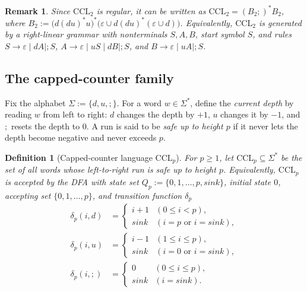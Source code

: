 \documentclass[11pt,a4paper]{article}
\newtheorem{definition}[theorem]{Definition}
\newtheorem{remark}[theorem]{Remark}
\begin{document}
\begin{remark}
Since $\mathrm{CCL}_2$ is regular, it can be written as $\mathrm{CCL}_2=(B_2;)^*B_2$, where $B_2:=\bigl(d(du)^*u\bigr)^*\bigl(\varepsilon \cup d(du)^*(\varepsilon \cup d)\bigr)$. Equivalently, $\mathrm{CCL}_2$ is generated by a \emph{right-linear grammar} with nonterminals $S,A,B$, start symbol $S$, and rules $S\to \varepsilon \mid dA \mid ;S$, $A\to \varepsilon \mid uS \mid dB \mid ;S$, and $B\to \varepsilon \mid uA \mid ;S$.
\end{remark}

\subsection{The capped-counter family}

Fix the alphabet $\Sigma:=\{d,u,;\}$. For a word $w\in\Sigma^*$, define the \emph{current depth} by reading $w$ from left to right: $d$ changes the depth by $+1$, $u$ changes it by $-1$, and $;$ resets the depth to $0$. A run is said to be \emph{safe up to height $p$} if it never lets the depth become negative and never exceeds $p$.

\begin{definition}[Capped-counter language \texorpdfstring{$\mathrm{CCL}_p$}{CCLp}]\label{def:cclp}
For $p\ge1$, let $\mathrm{CCL}_p\subseteq\Sigma^*$ be the set of all words whose left-to-right run is safe up to height $p$. Equivalently, $\mathrm{CCL}_p$ is accepted by the DFA with state set $Q_p:=\{0,1,\dots,p,\mathit{sink}\}$, initial state $0$, accepting set $\{0,1,\dots,p\}$, and transition function $\delta_p$
\[
\begin{aligned}
\delta_p(i,d)&=
\begin{cases}
i+1 & (0\le i<p),\\
\mathit{sink} & (i=p \text{ or } i=\mathit{sink}),
\end{cases}\\[0.4ex]
\delta_p(i,u)&=
\begin{cases}
i-1 & (1\le i\le p),\\
\mathit{sink} & (i=0 \text{ or } i=\mathit{sink}),
\end{cases}\\[0.4ex]
\delta_p(i,;)&=
\begin{cases}
0 & (0\le i\le p),\\
\mathit{sink} & (i=\mathit{sink}).
\end{cases}
\end{aligned}
\]
\end{definition}
\end{document}
